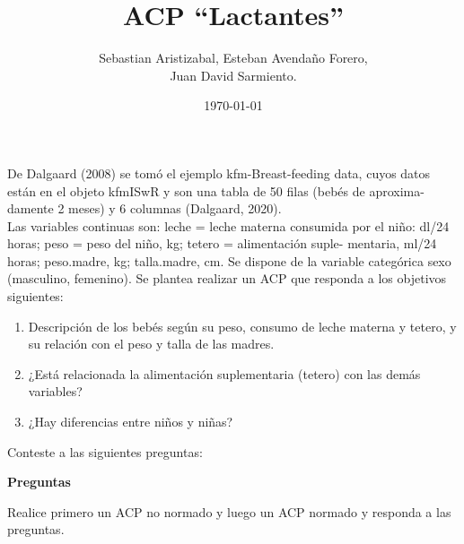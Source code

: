\documentclass[letterpaper, 12pt]{article}
\title{ACP ``Lactantes”}
\author{Sebastian Aristizabal, Esteban Avendaño Forero,\\
Juan David Sarmiento.}
\date{\today}
\begin{document}


\maketitle

De Dalgaard (2008) se tomó el ejemplo kfm-Breast-feeding data, cuyos datos
están en el objeto kfm{ISwR} y son una tabla de 50 filas (bebés de aproxima-
damente 2 meses) y 6 columnas (Dalgaard, 2020).\\

Las variables continuas son: leche = leche materna consumida por el
niño: dl/24 horas; peso = peso del niño, kg; tetero = alimentación suple-
mentaria, ml/24 horas; peso.madre, kg; talla.madre, cm. Se dispone de la
variable categórica sexo (masculino, femenino). Se plantea realizar un ACP
que responda a los objetivos siguientes:
\begin{enumerate}

        \item Descripción de los bebés según su peso, consumo de leche materna
        y tetero, y su relación con el peso y talla de las madres.
        \item ¿Está relacionada la alimentación suplementaria (tetero) con las 
        demás variables?
        \item ¿Hay diferencias entre niños y niñas?
        
\end{enumerate}

Conteste a las siguientes preguntas:

\newpage
\begin{center}
\textbf{Preguntas}
\end{center}

Realice primero un ACP no normado y luego un ACP normado y responda a las 
preguntas.
\end{document}
